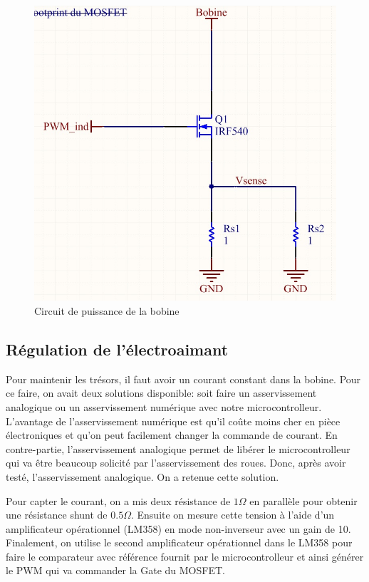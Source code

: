   \begin{figure}[H]
    \label{drive}
    \centering
    \includegraphics[scale=0.3]{resources/drivemosfet.jpg}
    \caption{Circuit de puissance de la bobine}
  \end{figure}

\subsection{Régulation de l'électroaimant}
Pour maintenir les trésors, il faut avoir un courant constant dans la bobine. Pour ce faire, on avait deux solutions disponible: soit faire un asservissement analogique ou un asservissement numérique avec notre microcontrolleur. L'avantage de l'asservissement numérique est qu'il coûte moins cher en pièce électroniques et qu'on peut facilement changer la commande de courant. En contre-partie, l'asservissement analogique permet de libérer le microcontrolleur qui va être beaucoup solicité par l'asservissement des roues. Donc, après avoir testé, l'asservissement analogique. On a retenue cette solution.

Pour capter le courant, on a mis deux résistance de $1 \Omega$ en parallèle pour obtenir une résistance shunt de $0.5 \Omega$. Ensuite on mesure cette tension à l'aide d'un amplificateur opérationnel (LM358) en mode non-inverseur avec un gain de 10. Finalement, on utilise le second amplificateur opérationnel dans le LM358 pour faire le comparateur avec référence fournit par le microcontrolleur et ainsi générer le PWM qui va commander la Gate du MOSFET.

